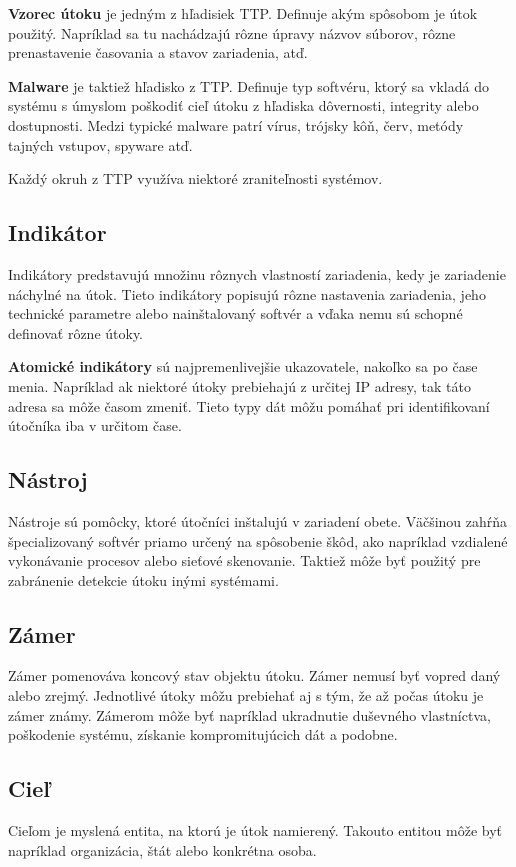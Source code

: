 \documentclass[12pt, a4paper, oneside]{book}
\begin{document}
\textbf{Vzorec útoku} je jedným z hľadisiek TTP. Definuje akým spôsobom je útok použitý. Napríklad sa tu nachádzajú rôzne úpravy názvov súborov, rôzne prenastavenie časovania a stavov zariadenia, atď. 


\textbf{Malware} je taktiež hľadisko z TTP. Definuje typ softvéru, ktorý sa vkladá do systému s úmyslom poškodiť cieľ útoku z hľadiska dôvernosti, integrity alebo dostupnosti. Medzi typické malware patrí vírus, trójsky kôň, červ, metódy tajných vstupov, spyware atď.


Každý okruh z TTP využíva niektoré zraniteľnosti systémov.


\subsection{Indikátor}
Indikátory predstavujú množinu rôznych vlastností zariadenia, kedy je zariadenie náchylné na útok. Tieto indikátory popisujú rôzne nastavenia zariadenia, jeho technické parametre alebo nainštalovaný softvér a vďaka nemu sú schopné definovať rôzne útoky.


\textbf{Atomické indikátory} sú najpremenlivejšie ukazovatele, nakoľko sa po čase menia. Napríklad ak niektoré útoky prebiehajú z určitej IP adresy, tak táto adresa sa môže časom zmeniť. Tieto typy dát môžu pomáhať pri identifikovaní útočníka iba v určitom čase.


\subsection{Nástroj}
Nástroje sú pomôcky, ktoré útočníci inštalujú v zariadení obete. Väčšinou zahŕňa špecializovaný softvér priamo určený na spôsobenie škôd, ako napríklad vzdialené vykonávanie procesov alebo sieťové skenovanie. Taktiež môže byť použitý pre zabránenie detekcie útoku inými systémami.


\subsection{Zámer}
Zámer pomenováva koncový stav objektu útoku. Zámer nemusí byť vopred daný alebo zrejmý. Jednotlivé útoky môžu prebiehať aj s tým, že až počas útoku je zámer známy. Zámerom môže byť napríklad ukradnutie duševného vlastníctva, poškodenie systému, získanie kompromitujúcich dát a podobne.


\subsection{Cieľ}
Cieľom je myslená entita, na ktorú je útok namierený. Takouto entitou môže byť napríklad organizácia, štát alebo konkrétna osoba.
\end{document}
